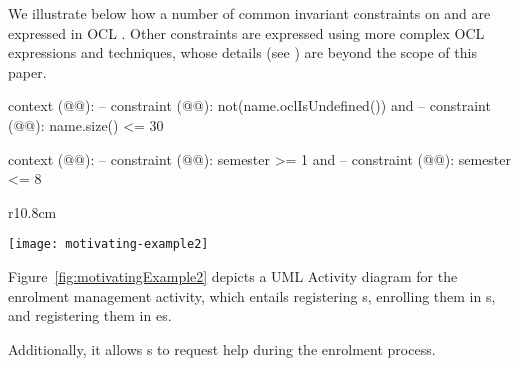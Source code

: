 We illustrate below how a number of common invariant constraints on  and  are expressed in OCL \cite{omg_object_2014}. Other constraints are expressed using more complex OCL expressions and techniques, whose details (see \cite{le_domain_2018}) are beyond the scope of this paper.

%
\begin{lstrulex}
context (@@):
  -- constraint (@@):
  not(name.oclIsUndefined()) and 
  -- constraint (@@):
  name.size() <= 30

context (@@):
  -- constraint (@@):
  semester >= 1 and 
  -- constraint (@@):
  semester <= 8
\end{lstrulex}

{\makeatletter
	\let\par\@@par
	\par{}
	\everypar{}
\begin{wrapfigure}{r}{10.8cm}
	\begin{center}
	\vspace{-0.6cm}		
	\texttt{[image: motivating-example2]}
	\end{center}
\vspace{-0.5cm}
	\caption{A UML Activity diagram to represent the enrolment management activity.}
	\label{fig:motivatingExample2}
\end{wrapfigure}
%
Figure~\ref{fig:motivatingExample2} depicts a UML Activity diagram for the enrolment management activity, which entails registering s, enrolling them in s, and registering them in es.%
\par}%
\noindent Additionally, it allows s to request help during the enrolment process.
